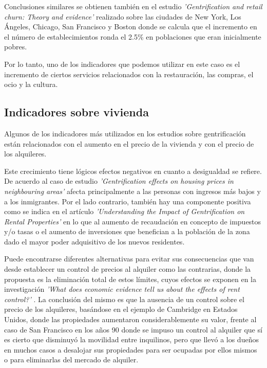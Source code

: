 \documentclass[12pt,a4paper,twoside]{book}
\begin{document}
Conclusiones similares se obtienen también en el estudio \textit{'Gentrification and retail churn: Theory and evidence'} \cite{glaeser_gentrification_2023} realizado sobre las ciudades de New York, Los Ángeles, Chicago, San Francisco y Boston donde se calcula que el incremento en el número de establecimientos ronda el 2.5\% en poblaciones que eran inicialmente pobres.

Por lo tanto, uno de los indicadores que podemos utilizar en este caso es el incremento de ciertos servicios relacionados con la restauración, las compras, el ocio y la cultura.

\subsection{Indicadores sobre vivienda}

Algunos de los indicadores más utilizados en los estudios sobre gentrificación están relacionados con el aumento en el precio de la vivienda y con el precio de los alquileres.

Este crecimiento tiene lógicos efectos negativos en cuanto a desigualdad se refiere. De acuerdo al caso de estudio \textit{'Gentrification effects on housing prices in neighbouring areas'} \cite{wilhelmsson_gentrification_2022} afecta principalmente a las personas con ingresos más bajos y a los inmigrantes. Por el lado contrario, también hay una componente positiva como se indica en el artículo \textit{'Understanding the Impact of Gentrification on Rental Properties'}\textit{} \cite{uniplaces_team_understanding_2024} en lo que al aumento de recaudación en concepto de impuestos y/o tasas o el aumento de inversiones que benefician a la población de la zona dado el mayor poder adquisitivo de los nuevos residentes.

Puede encontrarse diferentes alternativas para evitar sus consecuencias que van desde establecer un control de precios al alquiler como las contrarias, donde la propuesta es la eliminación total de estos límites, cuyos efectos se exponen en la investigación \textit{'What does economic evidence tell us about the effects of rent control?'} \cite{diamond_what_2018}. La conclusión del mismo es que la ausencia de un control sobre el precio de los alquileres, basándose en el ejemplo de Cambridge en Estados Unidos, donde las propiedades aumentaron considerablemente su valor, frente al caso de San Francisco en los años 90 donde se impuso un control al alquiler que sí es cierto que disminuyó la movilidad entre inquilinos, pero que llevó a los dueños en muchos casos a desalojar sus propiedades para ser ocupadas por ellos mismos o para eliminarlas del mercado de alquiler.
\end{document}
